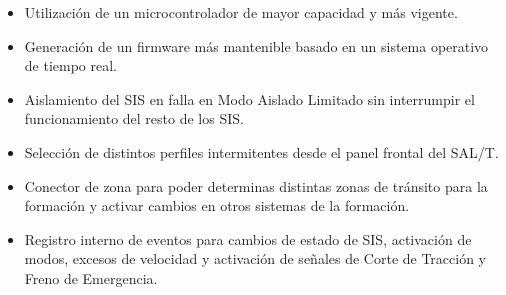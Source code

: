 \begin{itemize}
    \item Utilización de un microcontrolador de mayor capacidad y más vigente.
    \item Generación de un firmware más mantenible basado en un sistema operativo de tiempo real.
    \item Aislamiento del SIS en falla en Modo Aislado Limitado sin interrumpir el funcionamiento del resto de los SIS.
    \item Selección de distintos perfiles intermitentes desde el panel frontal del SAL/T.
    \item Conector de zona para poder determinas distintas zonas de tránsito para la formación y activar cambios en otros sistemas de la formación.
    \item Registro interno de eventos para cambios de estado de SIS, activación de modos, excesos de velocidad y activación de señales de Corte de Tracción y Freno de Emergencia.
\end{itemize}

